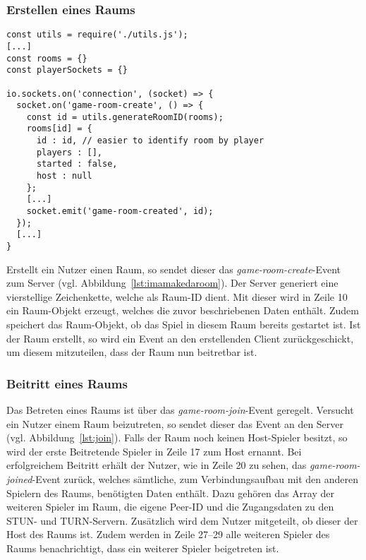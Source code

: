 \subsubsection{Erstellen eines Raums}

\vspace{11pt}
\lstset{language=js, style=STYLE_CODE_JS}
\begin{singlespace}
\begin{lstlisting}[caption={Event zum Erstellen eines Raums -- Server.js}, captionpos=b, label={lst:imamakedaroom}]
const utils = require('./utils.js');
[...]
const rooms = {}
const playerSockets = {}

io.sockets.on('connection', (socket) => {
  socket.on('game-room-create', () => {
    const id = utils.generateRoomID(rooms);
    rooms[id] = {
      id : id, // easier to identify room by player
      players : [],
      started : false,
      host : null
    };
    [...]	
    socket.emit('game-room-created', id);
  });
  [...]
}
\end{lstlisting}
\end{singlespace}

Erstellt ein Nutzer einen Raum, so sendet dieser das \textit{game-room-create}-Event zum Server (vgl. Abbildung~\ref{lst:imamakedaroom}). Der Server generiert eine vierstellige Zeichenkette, welche als Raum-ID dient. Mit dieser wird in Zeile 10 ein Raum-Objekt erzeugt, welches die zuvor beschriebenen Daten enthält. Zudem speichert das Raum-Objekt, ob das Spiel in diesem Raum bereits gestartet ist. Ist der Raum erstellt, so wird ein Event an den erstellenden Client zurückgeschickt, um diesem mitzuteilen, dass der Raum nun beitretbar ist.\par

\subsubsection{Beitritt eines Raums}

Das Betreten eines Raums ist über das \textit{game-room-join}-Event geregelt. Versucht ein Nutzer einem Raum beizutreten, so sendet dieser das Event an den Server (vgl. Abbildung~\ref{lst:join}). Falls der Raum noch keinen Host-Spieler besitzt, so wird der erste Beitretende Spieler in Zeile 17 zum Host ernannt. Bei erfolgreichem Beitritt erhält der Nutzer, wie in Zeile 20 zu sehen, das \textit{game-room-joined}-Event zurück, welches sämtliche, zum Verbindungsaufbau mit den anderen Spielern des Raums, benötigten Daten enthält. Dazu gehören das Array der weiteren Spieler im Raum, die eigene Peer-ID und die Zugangsdaten zu den \acs{STUN}- und \acs{TURN}-Servern. Zusätzlich wird dem Nutzer mitgeteilt, ob dieser der Host des Raums ist. Zudem werden in Zeile 27--29 alle weiteren Spieler des Raums benachrichtigt, dass ein weiterer Spieler beigetreten ist.\par

